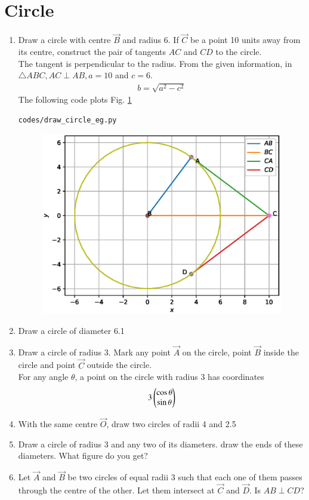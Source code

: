 \documentclass[journal,12pt,twocolumn]{IEEEtran}
\renewcommand\thesection{\arabic{section}}
\begin{document}
\section{Circle}
\begin{enumerate}[label=\thesection.\arabic*
,ref=\thesection.\theenumi]
\item Draw a circle with centre $\vec{B}$ and radius 6.  If $\vec{C}$ be  a point 10 units  away from its 
centre, construct the pair of tangents $AC$ and $CD$ to the 
circle.
\\
\solution The tangent is perpendicular to the radius.
%
From the given information, in $\triangle ABC, AC \perp AB, a = 
10$ and $c = 6$.
\begin{align}
b =  \sqrt{a^2-c^2}
\end{align}
The following code plots Fig. \ref{fig:circle}
\begin{lstlisting}
codes/draw_circle_eg.py
\end{lstlisting}
\begin{figure}[!ht]
\includegraphics[width=\columnwidth]{./figs/circle.eps}
\caption{}
\label{fig:circle}
\end{figure}
\item Draw a circle of diameter 6.1

\item Draw a circle of radius 3.  Mark any point $\vec{A}$ on the circle, point  $\vec{B}$ inside the circle  and point  $\vec{C}$ outside the circle.
\\
\solution 
For any angle $\theta$, a point on the circle with radius 3 has coordinates
\begin{align}
3\begin{pmatrix}\cos \theta\\ \sin\theta\end{pmatrix}
\end{align}
\item With the same centre $\vec{O}$,  draw two circles of radii 4 and 2.5
\item Draw a circle of radius 3 and any two of its diameters.  draw the ends of these diameters. What figure do you get?
\item Let $\vec{A}$ and $\vec{B}$ be two circles of equal radii 3 such that each one of them passes through the centre of the other.  Let them intersect at $\vec{C}$ and $\vec{D}$.  Is $AB \perp CD$?


\end{enumerate}
\end{document}
